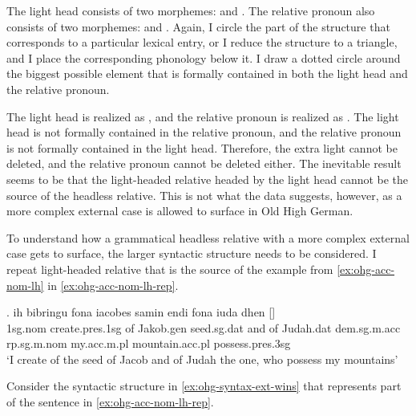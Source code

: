 The light head consists of two morphemes:  and .
The relative pronoun also consists of two morphemes:  and .
Again, I circle the part of the structure that corresponds to a particular lexical entry, or I reduce the structure to a triangle, and I place the corresponding phonology below it.
I draw a dotted circle around the biggest possible element that is formally contained in both the light head and the relative pronoun.

The light head is realized as , and the relative pronoun is realized as .
The light head is not formally contained in the relative pronoun, and the relative pronoun is not formally contained in the light head.
Therefore, the extra light cannot be deleted, and the relative pronoun cannot be deleted either.
The inevitable result seems to be that the light-headed relative headed by the light head cannot be the source of the headless relative.
This is not what the data suggests, however, as a more complex external case is allowed to surface in Old High German.

To understand how a grammatical headless relative with a more complex external case gets to surface, the larger syntactic structure needs to be considered. I repeat light-headed relative that is the source of the example from \ref{ex:ohg-acc-nom-lh} in \ref{ex:ohg-acc-nom-lh-rep}.

\exg. ih bibringu fona iacobes samin endi fona iuda dhen []   \\
1\ac{sg}.\ac{nom} {create}.\ac{pres}.1\ac{sg}\scsub{[acc]} of Jakob.\ac{gen} seed.\ac{sg}.\ac{dat} and of Judah.\ac{dat} \ac{dem}.\ac{sg}.\ac{m}.\ac{acc} \ac{rp}.\ac{sg}.\ac{m}.\ac{nom} my.\ac{acc}.\ac{m}.\ac{pl} mountain.\ac{acc}.\ac{pl} possess.\ac{pres}.3\ac{sg}\scsub{[nom]}\\
`I create of the seed of Jacob and of Judah the one, who possess my mountains' \label{ex:ohg-acc-nom-lh-rep}

Consider the syntactic structure in \ref{ex:ohg-syntax-ext-wins} that represents part of the sentence in \ref{ex:ohg-acc-nom-lh-rep}.

